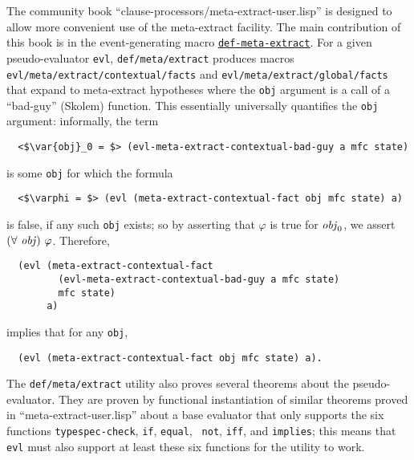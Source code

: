 The community book ``clause-processors/meta-extract-user.lisp'' is
designed to allow more convenient use of the meta-extract facility.
The main contribution of this book is in the event-generating macro
\href{http://www.cs.utexas.edu/users/moore/acl2/manuals/current/manual/index.html?topic=ACL2\_\_\_\_DEF-META-EXTRACT}{\underline{\tt def-meta-extract}}. For a given pseudo-evaluator \texttt{evl},
\texttt{def\-/meta\-/extract} produces macros
\texttt{evl\-/meta\-/extract\-/contextual\-/facts} and
\texttt{evl\-/meta\-/extract\-/global\-/facts} that expand to meta-extract
hypotheses where the \texttt{obj} argument is a call of a ``bad-guy'' (Skolem)
function.  This essentially universally quantifies the \texttt{obj}
argument: informally, the term
\begin{lstlisting}
  <$\var{obj}_0 = $> (evl-meta-extract-contextual-bad-guy a mfc state)
\end{lstlisting}
is
some {\tt obj} for which the formula
\begin{lstlisting}
  <$\varphi = $> (evl (meta-extract-contextual-fact obj mfc state) a)
\end{lstlisting}
is false, if any such {\tt obj} exists; so by
asserting that $\varphi$ is true for $\mathit{obj}_0$, we assert $(\forall\ \var{obj})\ 
\varphi$.  Therefore,
\begin{verbatim}
  (evl (meta-extract-contextual-fact
         (evl-meta-extract-contextual-bad-guy a mfc state)
         mfc state)
       a)
\end{verbatim}
implies that for any \texttt{obj},
\begin{verbatim}
  (evl (meta-extract-contextual-fact obj mfc state) a).
\end{verbatim}

The \texttt{def\-/meta\-/extract} utility also proves several theorems
about the pseudo-evaluator.  They are proven by
functional instantiation of similar theorems proved in
``meta-extract-user.lisp'' about a base evaluator that only supports
the six functions {\tt typespec-check}, {\tt if}, {\tt equal}, {\tt
  not}, {\tt iff}, and {\tt implies}; this means that {\tt evl} must
also support at least these six functions for the utility to work.


